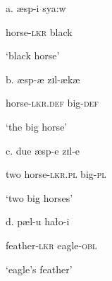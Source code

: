 \documentclass[output=paper]{langsci/langscibook}
\begin{document}
\begin{styleSfondomedioiColorexxi}
a.  æsp-i     sya:w      
\end{styleSfondomedioiColorexxi}

\begin{styleSfondomedioiColorexxi}
     horse-\textsc{lkr}  black
\end{styleSfondomedioiColorexxi}

\begin{styleSfondomedioiColorexxi}
‘black horse’ 
\end{styleSfondomedioiColorexxi}

\begin{styleSfondomedioiColorexxi}
b.   æsp{}-æ     zɪl-ækæ
\end{styleSfondomedioiColorexxi}

\begin{styleSfondomedioiColorexxi}
     horse-\textsc{lkr.def}  big-\textsc{def}
\end{styleSfondomedioiColorexxi}

\begin{styleSfondomedioiColorexxi}
‘the big horse’  
\end{styleSfondomedioiColorexxi}

\begin{styleSfondomedioiColorexxi}
c.   due   æsp-e    zɪl-e
\end{styleSfondomedioiColorexxi}

\begin{styleSfondomedioiColorexxi}
    two   horse-\textsc{lkr.pl}  big-\textsc{pl}
\end{styleSfondomedioiColorexxi}

\begin{styleSfondomedioiColorexxi}
‘two big horses’   
\end{styleSfondomedioiColorexxi}

\begin{styleSfondomedioiColorexxi}
d.   pæl-u     hało-i
\end{styleSfondomedioiColorexxi}

\begin{styleSfondomedioiColorexxi}
feather-\textsc{lkr}   eagle-\textsc{obl}
\end{styleSfondomedioiColorexxi}

\begin{styleSfondomedioiColorexxi}
‘eagle’s feather’      
\end{styleSfondomedioiColorexxi}
\end{document}
